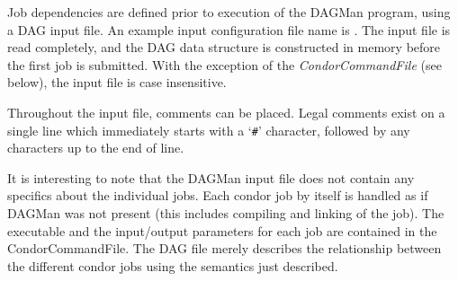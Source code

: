 Job dependencies are defined prior to execution of the DAGMan program, using a
DAG input file.  An example input configuration file name is
.  The input file is read completely, and the DAG data
structure is constructed in memory before the first job is submitted.  With
the exception of the \textit{CondorCommandFile} (see below), the input file is
case insensitive.

Throughout the input file, comments can be placed.  Legal comments exist on a
single line which immediately starts with a `\texttt{\#}' character, followed
by any characters up to the end of line.

It is interesting to note that the DAGMan input file does not contain any
specifics about the individual jobs. Each condor job by itself is handled as
if DAGMan was not present (this includes compiling and linking of the
job). The executable and the input/output parameters for each job are
contained in the CondorCommandFile.  The DAG file merely describes the
relationship between the different condor jobs using the semantics just
described.

